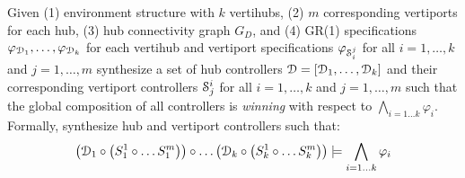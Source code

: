


Given (1) environment structure with $k$ vertihubs, (2) $m$ corresponding vertiports for each hub, (3) hub connectivity graph $G_D$, and (4) GR(1) specifications $\varphi_{\mathcal{D}_1},\dots, \varphi_{\mathcal{D}_k}$ for each vertihub and vertiport specifications $\varphi_{\mathcal{S}_i^j}$ for all $i = 1,\ldots,k$ and $j=1,\ldots,m$ synthesize a set of hub controllers $\mathcal{D} = [\mathcal{D}_1, \ldots, \mathcal{D}_k]$ and their corresponding vertiport controllers $\mathcal{S}^i_j$ for all $i = 1,\dots, k$ and $j = 1,\dots, m$ such that the global composition of all controllers is \emph{winning} with respect to $\bigwedge_{i=1\dots k}\varphi_i$.
Formally, synthesize hub and vertiport controllers such that:
\begin{equation}\label{eq:problem}
\left( \mathcal{D}_1 \circ \left( S_1^1 \circ \dots S_1^m \right) \right) \circ \dots \left( \mathcal{D}_k \circ \left( S_k^1 \circ \dots S_k^m \right) \right) \models \bigwedge_{i=1\dots k}\varphi_i
\end{equation}





